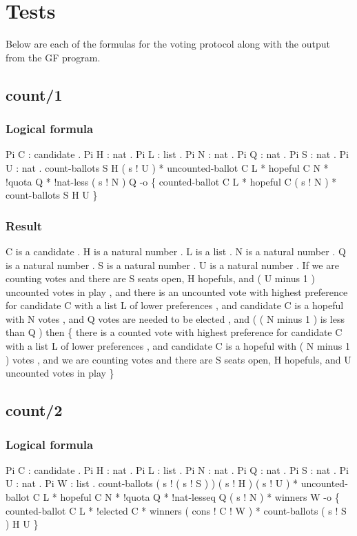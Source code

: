 \chapter{Tests}
\label{A_05}

Below are each of the formulas for the voting protocol along with the output from the GF program.

\section{count/1}
\subsection{Logical formula}
\begin{texto2}
	Pi C : candidate . Pi H : nat . Pi L : list . Pi N : nat . Pi Q : nat . Pi S : nat . Pi U : nat . count-ballots S H ( s ! U ) * uncounted-ballot C L * hopeful C N * !quota Q * !nat-less ( s ! N ) Q -o \{ counted-ballot C L * hopeful C ( s ! N ) * count-ballots S H U \}
\end{texto2}

\subsection{Result}
\begin{texto2}
	C is a candidate . H is a natural number . L is a list . N is a natural number . Q is a natural number . S is a natural number . U is a natural number . If we are counting votes and there are S seats open, H hopefuls, and ( U minus 1 ) uncounted votes in play , and there is an uncounted vote with highest preference for candidate C with a list L of lower preferences , and candidate C is a hopeful with N votes , and Q votes are needed to be elected , and ( ( N minus 1 ) is less than Q ) then \{ there is a counted vote with highest preference for candidate C with a list L of lower preferences , and candidate C is a hopeful with ( N minus 1 ) votes , and we are counting votes and there are S seats open, H hopefuls, and U uncounted votes in play \}
\end{texto2}

\section{count/2}
\subsection{Logical formula}
\begin{texto2}
	Pi C : candidate . Pi H : nat . Pi L : list . Pi N : nat . Pi Q : nat . Pi S : nat . Pi U : nat . Pi W : list . count-ballots ( s ! ( s ! S ) ) ( s ! H ) ( s ! U ) * uncounted-ballot C L * hopeful C N * !quota Q * !nat-lesseq Q ( s ! N ) * winners W -o \{ counted-ballot C L * !elected C * winners ( cons ! C ! W ) * count-ballots ( s ! S ) H U \}
\end{texto2}

